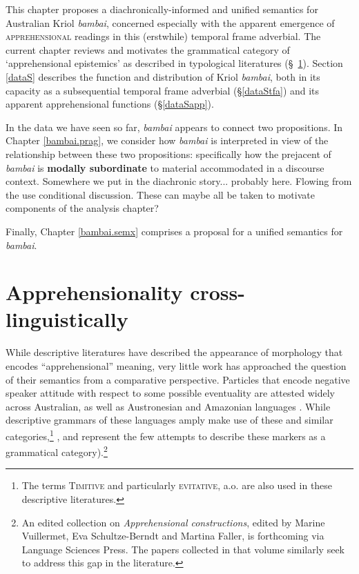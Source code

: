 This chapter proposes a diachronically-informed and unified semantics for Australian Kriol \textit{bambai}, concerned especially with the apparent emergence of \textsc{apprehensional} readings in this (erstwhile) temporal frame adverbial. 
The current chapter reviews and motivates the grammatical category of `apprehensional epistemics' as described in typological literatures (\S~\ref{typS}). Section \ref{dataS} describes the function and distribution of Kriol \textit{bambai}, both in its capacity as a subsequential temporal frame adverbial (§\ref{dataStfa}) and its apparent apprehensional functions (§\ref{dataSapp}). 

In the data we have seen so far, \textit{bambai} appears to connect two propositions. In Chapter \ref{bambai.prag}, we consider how \textit{bambai} is interpreted in view of the relationship between these two propositions: specifically how the prejacent of \textit{bambai} is \textbf{modally subordinate} to material accommodated in a discourse context. {\color{Blue} Somewhere we put in the diachronic story... probably here. Flowing from the use conditional discussion. These can maybe all be taken to motivate components of the analysis chapter?}%

Finally, Chapter \ref{bambai.semx} comprises a proposal for a unified semantics for \textit{bambai}.%





\section{Apprehensionality cross-linguistically}\label{typS}
While descriptive literatures have described the appearance of morphology that encodes ``apprehensional'' meaning, very little work has approached the question of their semantics from a comparative perspective. Particles that encode negative speaker attitude with respect to some possible eventuality are attested widely across Australian, as well as Austronesian and Amazonian languages \citep[258]{Angelo2016}. While descriptive grammars of these languages amply make use of these and similar categories,\footnote{The terms \textsc{Timitive} and particularly \textsc{evitative}, a.o. are also used in these descriptive literatures.} \citet{Lichtenberk1995}, \citet{Angelo2016,Angelo2018} and \cite{Vuillermet2018} represent the few attempts to describe these markers as a grammatical category).\footnote{An edited collection on  \textit{Apprehensional constructions}, edited by Marine Vuillermet, Eva Schultze-Berndt and Martina Faller, is forthcoming via Language Sciences Press. The papers collected in that volume similarly seek to address this gap in the literature.}

